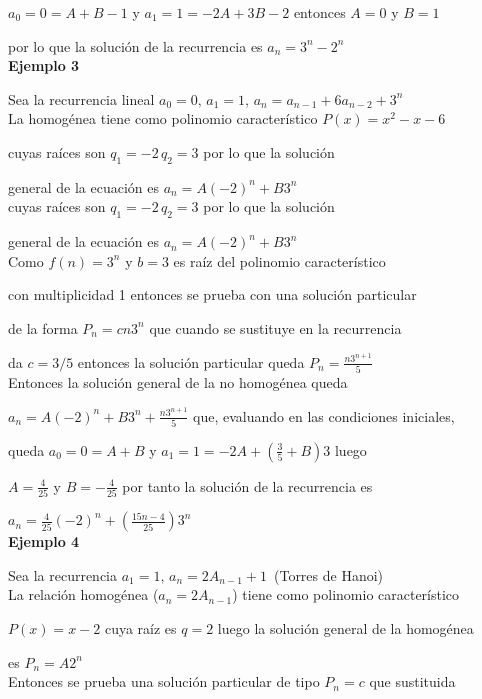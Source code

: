 \documentclass[a4paper,12pt]{report}
\begin{document}
$a_0=0=A+B-1$ y $a_1=1=-2A+3B-2$ entonces $A=0$ y $B=1$

por lo que la solución de la recurrencia es $a_n=3^n-2^n$\\

\textbf{Ejemplo 3}

Sea la recurrencia lineal $a_0=0,\, a_1=1,\, a_n=a_{n-1}+6a_{n-2}+3^n$\\

La homogénea tiene como polinomio característico $P(x)=x^2-x-6$ 

cuyas raíces son $q_1=-2\, q_2=3$ por lo que la solución 

general de la ecuación es  $a_n=A(-2)^n+B3^n$\\

cuyas raíces son $q_1=-2\, q_2=3$ por lo que la solución 

general de la ecuación es  $a_n=A(-2)^n+B3^n$\\

Como $f(n)=3^n$ y  $b=3$ es raíz del polinomio característico  

con  multiplicidad 1 entonces se prueba con una solución particular 

de la forma $P_n=cn3^n$ que cuando se sustituye en la recurrencia 

da $c=3/5$ entonces la solución particular queda $P_n=\frac{n3^{n+1}}{5}$\\

Entonces la solución general de la no homogénea queda 

$a_n=A(-2)^n+B3^n+\frac{n3^{n+1}}{5}$ que, evaluando en las condiciones iniciales,

queda $a_0=0=A+B$ y $a_1=1=-2A+(\frac{3}{5}+B)3$ luego 

$A=\frac{4}{25}$ y $B=-\frac{4}{25}$ por tanto la solución de la recurrencia es

$a_n=\frac{4}{25}(-2)^n+(\frac{15n-4}{25})3^n$\\

\textbf{Ejemplo 4}

Sea la recurrencia $a_1=1,\, a_n=2A_{n-1}+1$~(Torres de Hanoi)\\

La relación homogénea ($a_n=2A_{n-1}$) tiene como polinomio característico

$P(x)=x-2$ cuya raíz es $q=2$ luego la solución general de la homogénea 

es  $P_n=A2^n$\\

Entonces se prueba una solución particular de tipo $P_n=c$ que sustituida 
\end{document}
